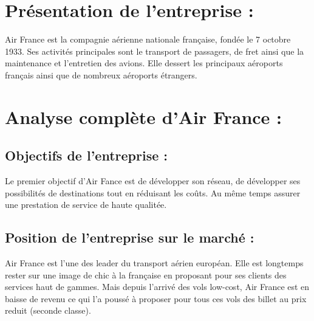\documentclass[oneside,13pt,a4paper]{article}
\begin{document}

\parskip=5pt


\parskip=0pt


\parskip=5pt
\section{Présentation de l'entreprise : }
Air France est la compagnie aérienne nationale française, fondée le 7 octobre 1933. Ses activités principales sont le transport de passagers, de fret ainsi que la maintenance et l'entretien des avions. Elle dessert les principaux aéroports français ainsi que de nombreux aéroports étrangers.

\section{Analyse complète d'Air France : }

\subsection{Objectifs de l'entreprise : }

Le premier objectif d'Air Fance est de développer son réseau, de développer ses possibilités de destinations tout en réduisant les coûts. Au même temps assurer une prestation de service de haute qualitée.

\subsection{Position de l'entreprise sur le marché : }
Air France est l'une des leader du transport aérien européan. Elle est longtemps rester sur une image de chic à la française en proposant pour ses clients des services haut de gammes. Mais depuis l'arrivé des vols low-cost, Air France est en baisse de revenu ce qui l'a poussé à proposer pour tous ces vols des billet au prix reduit (seconde classe).
\end{document}
